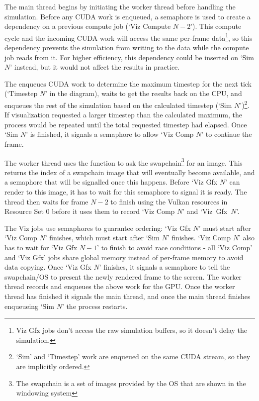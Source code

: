 The main thread begins by initiating the worker thread before handling the simulation.
Before any CUDA work is enqueued, a semaphore is used to create a dependency on a previous compute job (`Viz Compute $N - 2$'). %
This compute cycle and the incoming CUDA work will access the same per-frame data\footnote{Viz Gfx jobs don't access the raw simulation buffers, so it doesn't delay the simulation.}, so this dependency prevents the simulation from writing to the data while the compute job reads from it.
For higher efficiency, this dependency could be inserted on `Sim $N$' instead, but it would not affect the results in practice.

The  enqueues CUDA work to determine the maximum timestep for the next tick (`Timestep $N$' in the diagram), waits to get the results back on the CPU, and enqueues the rest of the simulation based on the calculated timestep (`Sim $N$')\footnote{`Sim' and `Timestep' work are enqueued on the same CUDA stream, so they are implicitly ordered.}.
If visualization requested a larger timestep than the calculated maximum, the process would be repeated until the total requested timestep had elapsed.
Once `Sim $N$' is finished, it signals a semaphore to allow `Viz Comp $N$' to continue the frame. %

The worker thread uses the  function to ask the swapchain\footnote{The swapchain is a set of images provided by the OS that are shown in the windowing system} for an image.
This returns the index of a swapchain image that will eventually become available, and a semaphore that will be signalled once this happens.
Before `Viz Gfx $N$' can render to this image, it has to wait for this semaphore to signal it is ready. %
The thread then waits for frame $N-2$ to finish using the Vulkan resources in Resource Set 0 before it uses them to record `Viz Comp $N$' and `Viz~Gfx~$N$'. %
\clearpage

The Viz jobs use semaphores to guarantee ordering:
`Viz Gfx $N$' must start after `Viz Comp $N$' finishes, which must start after `Sim $N$' finishes. %
`Viz Comp $N$' also has to wait for `Viz Gfx $N - 1$' to finish to avoid race conditions - all `Viz Comp' and `Viz Gfx' jobs share global memory instead of per-frame memory to avoid data copying. %
Once `Viz Gfx $N$' finishes, it signals a semaphore to tell the swapchain/OS to present the newly rendered frame to the screen.
The worker thread records and enqueues the above work for the GPU.
Once the worker thread has finished it signals the main thread, and once the main thread finishes enqueueing `Sim $N$' the process restarts.

